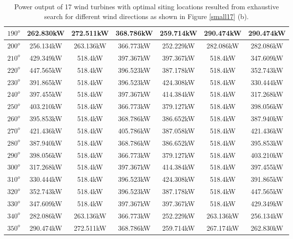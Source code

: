 \begin{table}[H]
\begin{tabular}{|c|c|c|c|c|c|c|}
		$190^o$	& 262.830kW	& 272.511kW	& 368.786kW	& 259.714kW	& 290.474kW	& 290.474kW	\\ \hline
		$200^o$	& 256.134kW	& 263.136kW	& 366.773kW	& 252.229kW	& 282.086kW	& 282.086kW	\\ \hline
		$210^o$	& 429.349kW	& 518.4kW	& 397.367kW	& 397.367kW	& 518.4kW	& 347.609kW	\\ \hline
		$220^o$	& 447.565kW	& 518.4kW	& 396.523kW	& 387.178kW	& 518.4kW	& 352.743kW	\\ \hline
		$230^o$	& 391.865kW	& 518.4kW	& 396.523kW	& 424.308kW	& 518.4kW	& 330.444kW	\\ \hline
		$240^o$	& 397.455kW	& 518.4kW	& 397.367kW	& 414.384kW	& 518.4kW	& 317.268kW	\\ \hline
		$250^o$	& 403.210kW	& 518.4kW	& 366.773kW	& 379.127kW	& 518.4kW	& 398.056kW	\\ \hline
		$260^o$	& 395.853kW	& 518.4kW	& 368.786kW	& 386.652kW	& 518.4kW	& 387.940kW	\\ \hline
		$270^o$	& 421.436kW	& 518.4kW	& 405.786kW	& 387.058kW	& 518.4kW	& 421.436kW	\\ \hline
		$280^o$	& 387.940kW	& 518.4kW	& 368.786kW	& 386.652kW	& 518.4kW	& 395.853kW	\\ \hline
		$290^o$	& 398.056kW	& 518.4kW	& 366.773kW	& 379.127kW	& 518.4kW	& 403.210kW	\\ \hline
		$300^o$	& 317.268kW	& 518.4kW	& 397.367kW	& 414.384kW	& 518.4kW	& 397.455kW	\\ \hline
		$310^o$	& 330.444kW	& 518.4kW	& 396.523kW	& 424.308kW	& 518.4kW	& 391.865kW	\\ \hline
		$320^o$	& 352.743kW	& 518.4kW	& 396.523kW	& 387.178kW	& 518.4kW	& 447.565kW	\\ \hline
		$330^o$	& 347.609kW	& 518.4kW	& 397.367kW	& 397.367kW	& 518.4kW	& 429.349kW	\\ \hline
		$340^o$	& 282.086kW	& 263.136kW	& 366.773kW	& 252.229kW	& 263.136kW	& 256.134kW	\\ \hline
		$350^o$	& 290.474kW	& 272.511kW	& 368.786kW	& 259.714kW	& 267.174kW	& 262.830kW	\\ \hline
        	\end{tabular}
        	\caption{Power output of 17 wind turbines with optimal siting locations resulted from exhaustive search for different wind directions as shown in Figure \ref{small17} (b).}
        	\label{table17b}
        \end{table}
